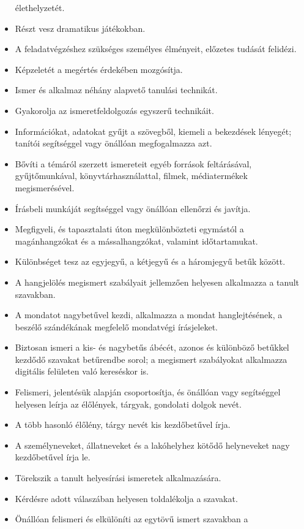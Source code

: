 \begin{itemize}
  élethelyzetét.
\item
  Részt vesz dramatikus játékokban.
\item
  A feladatvégzéshez szükséges személyes élményeit, előzetes tudását
  felidézi.
\item
  Képzeletét a megértés érdekében mozgósítja.
\item
  Ismer és alkalmaz néhány alapvető tanulási technikát.
\item
  Gyakorolja az ismeretfeldolgozás egyszerű technikáit.
\item
  Információkat, adatokat gyűjt a szövegből, kiemeli a bekezdések
  lényegét; tanítói segítséggel vagy önállóan megfogalmazza azt.
\item
  Bővíti a témáról szerzett ismereteit egyéb források feltárásával,
  gyűjtőmunkával, könyvtárhasználattal, filmek, médiatermékek
  megismerésével.
\item
  Írásbeli munkáját segítséggel vagy önállóan ellenőrzi és javítja.
\item
  Megfigyeli, és tapasztalati úton megkülönbözteti egymástól a
  magánhangzókat és a mássalhangzókat, valamint időtartamukat.
\item
  Különbséget tesz az egyjegyű, a kétjegyű és a háromjegyű betűk között.
\item
  A hangjelölés megismert szabályait jellemzően helyesen alkalmazza a
  tanult szavakban.
\item
  A mondatot nagybetűvel kezdi, alkalmazza a mondat hanglejtésének, a
  beszélő szándékának megfelelő mondatvégi írásjeleket.
\item
  Biztosan ismeri a kis- és nagybetűs ábécét, azonos és különböző
  betűkkel kezdődő szavakat betűrendbe sorol; a megismert szabályokat
  alkalmazza digitális felületen való kereséskor is.
\item
  Felismeri, jelentésük alapján csoportosítja, és önállóan vagy
  segítséggel helyesen leírja az élőlények, tárgyak, gondolati dolgok
  nevét.
\item
  A több hasonló élőlény, tárgy nevét kis kezdőbetűvel írja.
\item
  A személyneveket, állatneveket és a lakóhelyhez kötődő helyneveket
  nagy kezdőbetűvel írja le.
\item
  Törekszik a tanult helyesírási ismeretek alkalmazására.
\item
  Kérdésre adott válaszában helyesen toldalékolja a szavakat.
\item
  Önállóan felismeri és elkülöníti az egytövű ismert szavakban a

\end{itemize}
